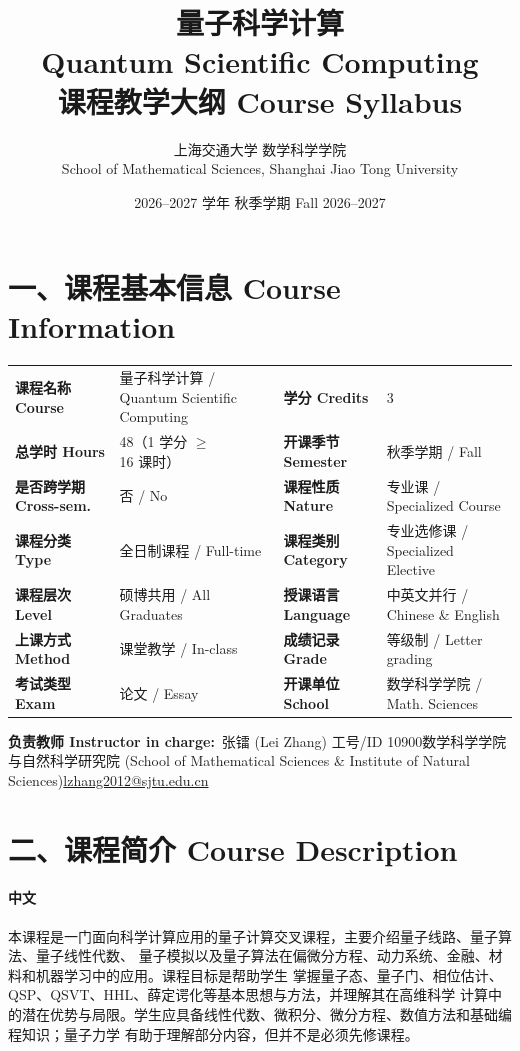 \documentclass[UTF8,11pt]{ctexart}
\title{\bfseries 量子科学计算 \\ Quantum Scientific Computing \\[0.4em]
  \large 课程教学大纲 \quad Course Syllabus}
\author{上海交通大学 数学科学学院 \\ School of Mathematical Sciences, Shanghai Jiao Tong University}
\date{2026--2027 学年 秋季学期 \quad Fall 2026--2027}
\begin{document}
\maketitle

\section*{一、课程基本信息 \quad Course Information}

\begin{tabularx}{\textwidth}{@{}l Y l Y@{}}
\toprule
\textbf{课程名称 Course} & 量子科学计算 / Quantum Scientific Computing
  & \textbf{学分 Credits} & 3 \\
\textbf{总学时 Hours} & 48（1 学分 $\ge$ 16 课时）
  & \textbf{开课季节 Semester} & 秋季学期 / Fall \\
\textbf{是否跨学期 Cross-sem.} & 否 / No
  & \textbf{课程性质 Nature} & 专业课 / Specialized Course \\
\textbf{课程分类 Type} & 全日制课程 / Full-time
  & \textbf{课程类别 Category} & 专业选修课 / Specialized Elective \\
\textbf{课程层次 Level} & 硕博共用 / All Graduates
  & \textbf{授课语言 Language} & 中英文并行 / Chinese \& English \\
\textbf{上课方式 Method} & 课堂教学 / In-class
  & \textbf{成绩记录 Grade} & 等级制 / Letter grading \\
\textbf{考试类型 Exam} & 论文 / Essay
  & \textbf{开课单位 School} & 数学科学学院 / Math. Sciences \\
\bottomrule
\end{tabularx}

\medskip
\noindent\textbf{负责教师 Instructor in charge:}\ 张镭 (Lei Zhang)\quad
工号/ID 10900\quad 数学科学学院与自然科学研究院 (School of Mathematical Sciences \&
Institute of Natural Sciences)\quad \href{mailto:lzhang2012@sjtu.edu.cn}{lzhang2012@sjtu.edu.cn}

\section*{二、课程简介 \quad Course Description}

\paragraph{中文}
本课程是一门面向科学计算应用的量子计算交叉课程，主要介绍量子线路、量子算法、量子线性代数、
量子模拟以及量子算法在偏微分方程、动力系统、金融、材料和机器学习中的应用。课程目标是帮助学生
掌握量子态、量子门、相位估计、QSP、QSVT、HHL、薛定谔化等基本思想与方法，并理解其在高维科学
计算中的潜在优势与局限。学生应具备线性代数、微积分、微分方程、数值方法和基础编程知识；量子力学
有助于理解部分内容，但并不是必须先修课程。
\end{document}
